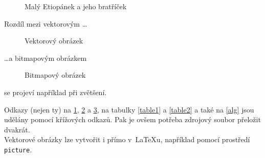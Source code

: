\documentclass[11pt]{article}
\begin{document}
	\begin{figure}[h]
		\begin{center}
			\caption{Malý Etiopánek a jeho bratříček}
			\label{image1}
		\end{center}
	\end{figure}
	
	\newpage

	Rozdíl mezi vektorovým \dots
	
	\begin{figure}[h]
		\begin{center}
			\caption{Vektorový obrázek}
			\label{image2}
		\end{center}
	\end{figure}

	\dots a bitmapovým obrázkem 
	
	\begin{figure}[h]
		\begin{center}
			\caption{Bitmapový obrázek}
			\label{image3}
		\end{center}
	\end{figure}

	se projeví například při zvětšení.

	Odkazy (nejen ty) na \ref{image1},  \ref{image2} a  \ref{image3}, na tabulky  \ref{table1}
	a \ref{table2} a také na \ref{alg} jsou udělány pomocí křížových odkazů. Pak je ovšem
	potřeba zdrojový soubor přeložit dvakrát. \\Vektorové obrázky lze vytvořit i přímo v~\LaTeX u, například pomocí prostředí \texttt{picture}.
	
	\newpage
	
\end{document}
